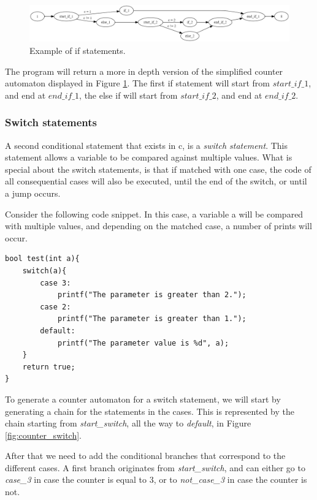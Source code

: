 \documentclass[12pt]{article}
\begin{document}
\begin{figure}[h]
	\centering
	\includegraphics[width=\linewidth]{test2_counter_automaton}
	\caption{Example of if statements.}
	\label{fig:test2_counter_automaton}
\end{figure}

The program will return a more in depth version of the simplified counter automaton displayed in Figure \ref{fig:test2_counter_automaton}. The first if statement will start from $start\_if\_1$, and end at $end\_if\_1$, the else if will start from $start\_if\_2$, and end at $end\_if\_2$.

\subsubsection{Switch statements}
A second conditional statement that exists in c, is a \textit{switch statement}. This statement allows a variable to be compared against multiple values. What is special about the switch statements, is that if matched with one case, the code of all consequential cases will also be executed, until the end of the switch, or until a jump occurs.

Consider the following code snippet. In this case, a variable a will be compared with multiple values, and depending on the matched case, a number of prints will occur.

\begin{lstlisting}[style=CStyle]
bool test(int a){
	switch(a){
		case 3:
			printf("The parameter is greater than 2.");
		case 2:
			printf("The parameter is greater than 1.");
		default:
			printf("The parameter value is %d", a);
	}
	return true;
}
\end{lstlisting}

To generate a counter automaton for a switch statement, we will start by generating a chain for the statements in the cases. This is represented by the chain starting from \textit{start\_switch}, all the way to \textit{default}, in Figure \ref{fig:counter_switch}.

After that we need to add the conditional branches that correspond to the different cases. A first branch originates from \textit{start\_switch}, and can either go to \textit{case\_3} in case the counter is equal to 3, or to \textit{not\_case\_3} in case the counter is not.
\end{document}

